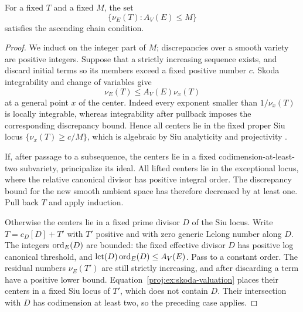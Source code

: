 \begin{lemma}\label{proj:ex:valuation-acc}
For a fixed \(T\) and a fixed \(M\), the set
\[
 \{\nu_E(T): A_V(E)\leq M\}
\]
satisfies the ascending chain condition.
\end{lemma}
\begin{proof}
We induct on the integer part of \(M\); discrepancies over a
smooth variety are positive integers. Suppose that a strictly
increasing sequence exists, and discard initial terms so its
members exceed a fixed positive number \(c\).
Skoda integrability and change of variables give
\begin{equation}\label{proj:ex:skoda-valuation}
 \nu_E(T)\leq A_V(E)\nu_x(T)
\end{equation}
at a general point \(x\) of the center. Indeed every exponent
smaller than \(1/\nu_x(T)\) is locally integrable, whereas
integrability after pullback imposes the corresponding
discrepancy bound. Hence all centers lie in the fixed proper Siu
locus \(\{\nu_x(T)\geq c/M\}\), which is algebraic by Siu
analyticity and projectivity \cite{Proj-Siu1974}.

If, after passage to a subsequence, the centers lie in a fixed
codimension-at-least-two subvariety, principalize its ideal.
All lifted centers lie in the exceptional locus, where the
relative canonical divisor has positive integral order.
The discrepancy bound for the new smooth ambient space has
therefore decreased by at least one. Pull back \(T\) and apply
induction.

Otherwise the centers lie in a fixed prime divisor \(D\) of the
Siu locus. Write \(T=c_D[D]+T'\) with \(T'\) positive and with
zero generic Lelong number along \(D\). The integers
\(\operatorname{ord}_E(D)\) are bounded: the fixed effective divisor \(D\) has
positive log canonical threshold, and
\(\operatorname{lct}(D)\operatorname{ord}_E(D)\leq A_V(E)\).
Pass to a constant order. The residual numbers \(\nu_E(T')\)
are still strictly increasing, and after discarding a term have
a positive lower bound. Equation~\eqref{proj:ex:skoda-valuation}
places their centers in a fixed Siu locus of \(T'\), which does
not contain \(D\). Their intersection with \(D\) has codimension
at least two, so the preceding case applies.
\end{proof}

